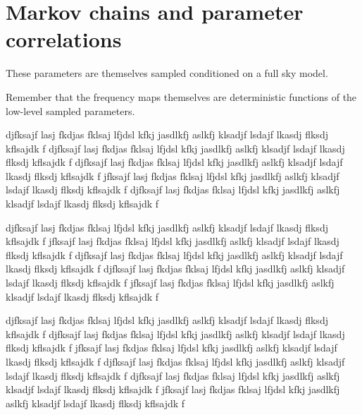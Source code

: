\documentclass[twocolumn]{../../common/aa}
\begin{document}

\clearpage

\section{Markov chains and parameter correlations}
\label{sec:traceplots}






These parameters are themselves sampled conditioned on a full sky model.

Remember that the frequency maps themselves are deterministic functions of the low-level sampled parameters.



djfksajf lasj fkdjas fklsaj lfjdsl kfkj jasdlkfj aslkfj klsadjf lsdajf lkasdj flksdj kflsajdk f
djfksajf lasj fkdjas fklsaj lfjdsl kfkj jasdlkfj aslkfj klsadjf lsdajf lkasdj flksdj kflsajdk f
djfksajf lasj fkdjas fklsaj lfjdsl kfkj jasdlkfj aslkfj klsadjf lsdajf lkasdj flksdj kflsajdk f
jfksajf lasj fkdjas fklsaj lfjdsl kfkj jasdlkfj aslkfj klsadjf lsdajf lkasdj flksdj kflsajdk f
djfksajf lasj fkdjas fklsaj lfjdsl kfkj jasdlkfj aslkfj klsadjf lsdajf lkasdj flksdj kflsajdk f

djfksajf lasj fkdjas fklsaj lfjdsl kfkj jasdlkfj aslkfj klsadjf lsdajf lkasdj flksdj kflsajdk f
jfksajf lasj fkdjas fklsaj lfjdsl kfkj jasdlkfj aslkfj klsadjf lsdajf lkasdj flksdj kflsajdk f
djfksajf lasj fkdjas fklsaj lfjdsl kfkj jasdlkfj aslkfj klsadjf lsdajf lkasdj flksdj kflsajdk f
djfksajf lasj fkdjas fklsaj lfjdsl kfkj jasdlkfj aslkfj klsadjf lsdajf lkasdj flksdj kflsajdk f
jfksajf lasj fkdjas fklsaj lfjdsl kfkj jasdlkfj aslkfj klsadjf lsdajf lkasdj flksdj kflsajdk f

djfksajf lasj fkdjas fklsaj lfjdsl kfkj jasdlkfj aslkfj klsadjf lsdajf lkasdj flksdj kflsajdk f
djfksajf lasj fkdjas fklsaj lfjdsl kfkj jasdlkfj aslkfj klsadjf lsdajf lkasdj flksdj kflsajdk f
jfksajf lasj fkdjas fklsaj lfjdsl kfkj jasdlkfj aslkfj klsadjf lsdajf lkasdj flksdj kflsajdk f
djfksajf lasj fkdjas fklsaj lfjdsl kfkj jasdlkfj aslkfj klsadjf lsdajf lkasdj flksdj kflsajdk f
djfksajf lasj fkdjas fklsaj lfjdsl kfkj jasdlkfj aslkfj klsadjf lsdajf lkasdj flksdj kflsajdk f
jfksajf lasj fkdjas fklsaj lfjdsl kfkj jasdlkfj aslkfj klsadjf lsdajf lkasdj flksdj kflsajdk f
\end{document}

